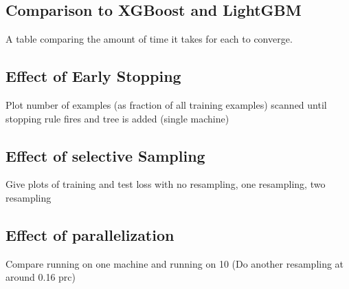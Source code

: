 \subsection{Comparison to XGBoost and LightGBM}


A table comparing the amount of time it takes for each to converge.

\subsection{Effect of Early Stopping}
Plot number of examples (as fraction of all training examples) scanned until stopping rule fires and  tree is added (single machine)

\subsection{Effect of selective Sampling}
Give plots of training and test loss with no resampling, one resampling, two resampling

\subsection{Effect of parallelization}
Compare running on one machine and running on 10 (Do another resampling at around 0.16 prc)



\fi
